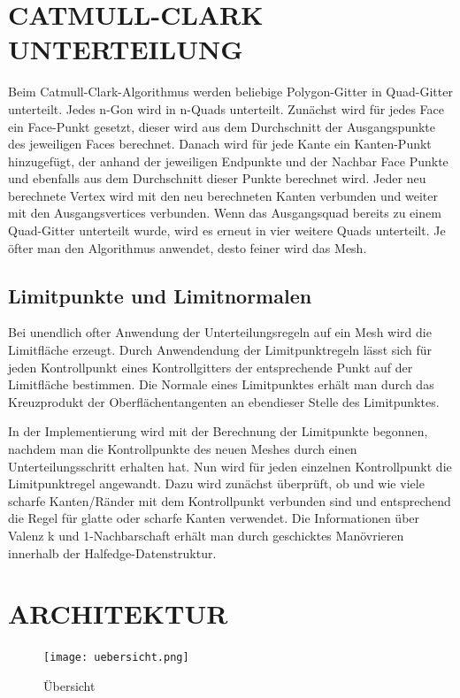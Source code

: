 \section{\Large CATMULL-CLARK UNTERTEILUNG}
Beim Catmull-Clark-Algorithmus werden beliebige Polygon-Gitter in Quad-Gitter unterteilt. Jedes n-Gon wird in n-Quads unterteilt. Zunächst wird für jedes Face ein Face-Punkt gesetzt, dieser wird aus dem Durchschnitt der Ausgangspunkte des jeweiligen Faces berechnet. Danach wird für jede Kante ein Kanten-Punkt hinzugefügt, der anhand der jeweiligen Endpunkte und der Nachbar Face Punkte und ebenfalls aus dem Durchschnitt dieser Punkte berechnet wird. Jeder neu berechnete Vertex wird mit den neu berechneten Kanten verbunden und weiter mit den Ausgangsvertices verbunden. Wenn das Ausgangsquad bereits zu einem Quad-Gitter unterteilt wurde, wird es erneut in vier weitere Quads unterteilt. Je öfter man den Algorithmus anwendet, desto feiner wird das Mesh.

\subsection{Limitpunkte und Limitnormalen}
Bei unendlich ofter Anwendung der Unterteilungsregeln auf ein Mesh wird die Limitfläche erzeugt. Durch Anwendendung der Limitpunktregeln lässt sich für jeden Kontrollpunkt eines Kontrollgitters der entsprechende Punkt auf der Limitfläche bestimmen. Die Normale eines Limitpunktes erhält man durch das Kreuzprodukt der Oberflächentangenten an ebendieser Stelle des Limitpunktes.\par In der Implementierung wird mit der Berechnung der Limitpunkte begonnen, nachdem man die Kontrollpunkte des neuen Meshes durch einen Unterteilungsschritt erhalten hat. Nun wird für jeden einzelnen Kontrollpunkt die Limitpunktregel angewandt. Dazu wird zunächst überprüft, ob und wie viele scharfe Kanten/Ränder mit dem Kontrollpunkt verbunden sind und entsprechend die Regel für glatte oder scharfe Kanten verwendet. Die Informationen über Valenz k und 1-Nachbarschaft erhält man durch geschicktes Manövrieren innerhalb der Halfedge-Datenstruktur.

\section{\Large ARCHITEKTUR}

\begin{figure}[H]
\centering
\texttt{[image: uebersicht.png]}
\caption{Übersicht}
\label{fig1}
\end{figure}

